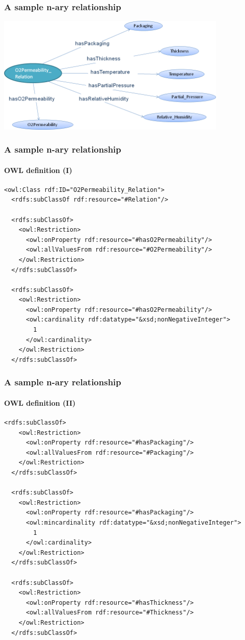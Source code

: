 \documentclass{beamer}
\begin{document}
\begin{frame}
  \frametitle{A sample n-ary relationship}

  \begin{center}
    \includegraphics[width=11cm]{relation.png}
  \end{center}
\end{frame}

\begin{frame}[fragile]
  \frametitle{A sample n-ary relationship}
  \framesubtitle{OWL definition (I)}

  \begin{Verbatim}[fontsize=\scriptsize]
<owl:Class rdf:ID="O2Permeability_Relation">
  <rdfs:subClassOf rdf:resource="#Relation"/>

  <rdfs:subClassOf>
    <owl:Restriction>
      <owl:onProperty rdf:resource="#hasO2Permeability"/>
      <owl:allValuesFrom rdf:resource="#O2Permeability"/>
    </owl:Restriction>
  </rdfs:subClassOf>

  <rdfs:subClassOf>
    <owl:Restriction>
      <owl:onProperty rdf:resource="#hasO2Permeability"/>
      <owl:cardinality rdf:datatype="&xsd;nonNegativeInteger">
        1
      </owl:cardinality>
    </owl:Restriction>
  </rdfs:subClassOf>
  \end{Verbatim}
\end{frame}

\begin{frame}[fragile]
  \frametitle{A sample n-ary relationship}
  \framesubtitle{OWL definition (II)}

  \begin{Verbatim}[fontsize=\scriptsize]
  <rdfs:subClassOf>
    <owl:Restriction>
      <owl:onProperty rdf:resource="#hasPackaging"/>
      <owl:allValuesFrom rdf:resource="#Packaging"/>
    </owl:Restriction>
  </rdfs:subClassOf>

  <rdfs:subClassOf>
    <owl:Restriction>
      <owl:onProperty rdf:resource="#hasPackaging"/>
      <owl:mincardinality rdf:datatype="&xsd;nonNegativeInteger">
        1
      </owl:cardinality>
    </owl:Restriction>
  </rdfs:subClassOf>

  <rdfs:subClassOf>
    <owl:Restriction>
      <owl:onProperty rdf:resource="#hasThickness"/>
      <owl:allValuesFrom rdf:resource="#Thickness"/>
    </owl:Restriction>
  </rdfs:subClassOf>
  \end{Verbatim}
\end{frame}
\end{document}
